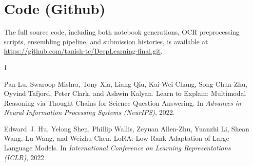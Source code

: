 \documentclass[11pt]{article}
\begin{document}
\section*{Code (Github)}
The full source code, including both notebook generations, OCR preprocessing scripts, ensembling pipeline, and submission histories, is available at \url{https://github.com/tanish-tc/DeepLearning-final.git}.


\begin{thebibliography}{1}

Pan Lu, Swaroop Mishra, Tony Xia, Liang Qiu, Kai-Wei Chang, Song-Chun Zhu, Oyvind Tafjord, Peter Clark, and Ashwin Kalyan.
\newblock Learn to Explain: Multimodal Reasoning via Thought Chains for Science Question Answering.
\newblock In \emph{Advances in Neural Information Processing Systems (NeurIPS)}, 2022.

Edward~J. Hu, Yelong Shen, Phillip Wallis, Zeyuan Allen-Zhu, Yuanzhi Li, Shean Wang, Lu Wang, and Weizhu Chen.
\newblock LoRA: Low-Rank Adaptation of Large Language Models.
\newblock In \emph{International Conference on Learning Representations (ICLR)}, 2022.

\end{thebibliography}
\end{document}
